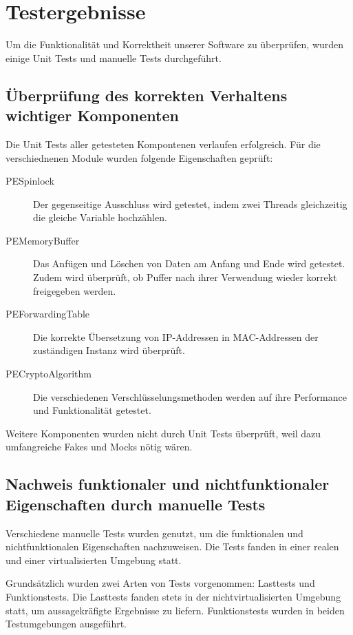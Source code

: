 \section{Testergebnisse}
Um die Funktionalität und Korrektheit unserer Software zu überprüfen, wurden einige Unit Tests und manuelle Tests durchgeführt. 


\subsection{Überprüfung des korrekten Verhaltens wichtiger Komponenten}
Die Unit Tests aller getesteten Kompontenen verlaufen erfolgreich. 
Für die verschiednenen Module wurden folgende Eigenschaften geprüft:

\begin{description}
\item[PESpinlock]
	Der gegenseitige Ausschluss wird getestet, indem zwei Threads gleichzeitig die gleiche Variable hochzählen.
	
\item[PEMemoryBuffer]
	Das Anfügen und Löschen von Daten am Anfang und Ende wird getestet. 
	Zudem wird überprüft, ob Puffer nach ihrer Verwendung wieder korrekt freigegeben werden.
	
\item[PEForwardingTable]
	Die korrekte Übersetzung von IP-Addressen in MAC-Addressen der zuständigen Instanz wird überprüft.
	
\item[PECryptoAlgorithm]
	Die verschiedenen Verschlüsselungsmethoden werden auf ihre Performance und Funktionalität getestet. 
\end{description}

Weitere Komponenten wurden nicht durch Unit Tests überprüft, weil dazu umfangreiche Fakes und Mocks nötig wären.

\subsection{Nachweis funktionaler und nichtfunktionaler Eigenschaften durch manuelle Tests}
Verschiedene manuelle Tests wurden genutzt, um die funktionalen und nichtfunktionalen Eigenschaften nachzuweisen.
Die Tests fanden in einer realen und einer virtualisierten Umgebung statt.

Grundsätzlich wurden zwei Arten von Tests vorgenommen: Lasttests und Funktionstests.
Die Lasttests fanden stets in der nichtvirtualisierten Umgebung statt, um aussagekräfigte Ergebnisse zu liefern. Funktionstests wurden in beiden Testumgebungen ausgeführt.

